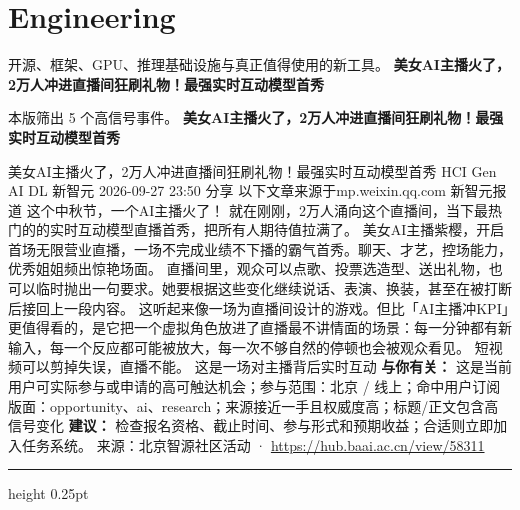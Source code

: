 \documentclass[10.5pt]{ctexart}
\begin{document}
\section*{Engineering}
{\color{ormuted} 开源、框架、GPU、推理基础设施与真正值得使用的新工具。}
\vspace{2mm}
{\LARGE\bfseries 美女AI主播火了，2万人冲进直播间狂刷礼物！最强实时互动模型首秀}\par
\vspace{1mm}
{\color{ormuted} 本版筛出 5 个高信号事件。}
\vspace{3mm}
{\Large\bfseries 美女AI主播火了，2万人冲进直播间狂刷礼物！最强实时互动模型首秀}\par
美女AI主播火了，2万人冲进直播间狂刷礼物！最强实时互动模型首秀 HCI Gen AI DL 新智元 2026-09-27 23:50 分享 以下文章来源于mp.weixin.qq.com 新智元报道 这个中秋节，一个AI主播火了！ 就在刚刚，2万人涌向这个直播间，当下最热门的的实时互动模型直播首秀，把所有人期待值拉满了。 美女AI主播紫樱，开启首场无限营业直播，一场不完成业绩不下播的霸气首秀。聊天、才艺，控场能力，优秀姐姐频出惊艳场面。 直播间里，观众可以点歌、投票选造型、送出礼物，也可以临时抛出一句要求。她要根据这些变化继续说话、表演、换装，甚至在被打断后接回上一段内容。 这听起来像一场为直播间设计的游戏。但比「AI主播冲KPI」更值得看的，是它把一个虚拟角色放进了直播最不讲情面的场景：每一分钟都有新输入，每一个反应都可能被放大，每一次不够自然的停顿也会被观众看见。 短视频可以剪掉失误，直播不能。 这是一场对主播背后实时互动
\textbf{与你有关：} 这是当前用户可实际参与或申请的高可触达机会；参与范围：北京 / 线上；命中用户订阅版面：opportunity、ai、research；来源接近一手且权威度高；标题/正文包含高信号变化
\textbf{建议：} 检查报名资格、截止时间、参与形式和预期收益；合适则立即加入任务系统。
{\footnotesize\color{ormuted} 来源：北京智源社区活动 · \url{https://hub.baai.ac.cn/view/58311}}
\vspace{4mm}
\hrule height 0.25pt
\vspace{3mm}
\end{document}

